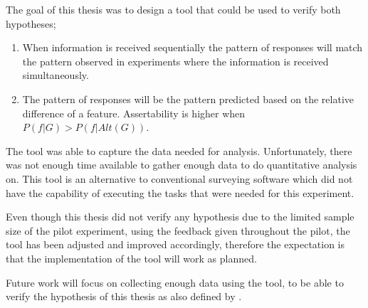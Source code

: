 \documentclass[twoside]{uva-inf-bachelor-thesis}
\theoremstyle{definition}
\begin{document}
The goal of this thesis was to design a tool that could be used to verify both hypotheses;
\begin{enumerate}
  \item When information is received sequentially the pattern of responses will match the pattern observed in experiments where the information is received simultaneously.
  \item The pattern of responses will be the pattern predicted based on the relative difference of a feature. Assertability is higher when $P(f|G) > P(f|Alt(G))$.
\end{enumerate}

The tool was able to capture the data needed for analysis. Unfortunately, there was not enough time available to gather enough data to do quantitative analysis on. This tool is an alternative to conventional surveying software which did not have the capability of executing the tasks that were needed for this experiment. 

Even though this thesis did not verify any hypothesis due to the limited sample size of the pilot experiment, using the feedback given throughout the pilot, the tool has been adjusted and improved accordingly, therefore the expectation is that the implementation of the tool will work as planned. 

Future work will focus on collecting enough data using the tool, to be able to verify the hypothesis of this thesis as also defined by \cite{RooijSchulzGenAlt}. 

\printbibliography
{}
\end{document}
